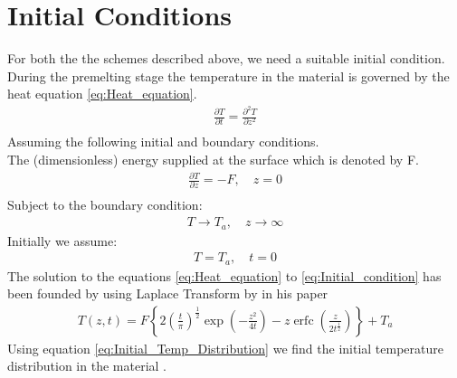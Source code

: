 \section{Initial Conditions \label{sec:initial_condition_given}}
For both the the schemes described above, we need a suitable initial condition. During the premelting stage the temperature in the material is governed by the heat equation \eqref{eq:Heat_equation}.
\begin{subequations}
    \begin{align}
        \frac{\partial T}{\partial t} = \frac{\partial^2 T}{\partial z^2} \label{eq:Heat_equation}\\ 
        \nonumber
        \end{align}
\end{subequations}
Assuming the following initial and boundary conditions. \\
The (dimensionless) energy supplied at the surface which is denoted by F. \\
\begin{subequations}
    \begin{align}
        \frac{\partial T}{\partial z} = -F, \quad z = 0 \\ \nonumber
    \end{align}
\end{subequations}
Subject to the boundary condition: \\
\begin{subequations}
    \begin{align}
        T \rightarrow T_a, \quad z \rightarrow \infty
        \end{align}
\end{subequations}
Initially we assume: \\
\begin{subequations}
    \begin{align}
        T = T_a, \quad t = 0 \label{eq:Initial_condition}
        \end{align}
\end{subequations}
The solution to the equations \eqref{eq:Heat_equation} to \eqref{eq:Initial_condition} has been founded by using Laplace Transform by \cite{verhoeven2003modelling} in his paper
\begin{subequations}
    \begin{align}
    T(z,t) = F \left\{ 2 \left(\frac{t}{\pi} \right)^{\frac{1}{2}} \exp\left(-\frac{z^2}{4t}\right)-z \operatorname{erfc}\left(\frac{z}{2t^{\frac{1}{2}}}\right) \right\} + T_a \label{eq:Initial_Temp_Distribution}
    \end{align}
\end{subequations}
Using equation \eqref{eq:Initial_Temp_Distribution} we find the initial temperature distribution in the material .\\


